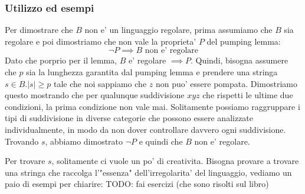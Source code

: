 
\subsubsection{Utilizzo ed esempi}
Per dimostrare che $ B $ non e' un linguaggio regolare, prima assumiamo che $ B $ sia regolare e poi dimostriamo che non vale la proprieta' $ P $ del pumping lemma:
\[
\lnot P \implies B \text{ non e' regolare}
\]
Dato che porprio per il lemma, $ B $ e' regolare $ \implies P $. Quindi, bisogna assumere che $ p $ sia la lunghezza garantita dal pumping lemma e prendere una stringa $ s \in B. |s| \geq p $ tale che noi sappiamo che $ z $ non puo' essere pompata. Dimostriamo questo mostrando che per qualunque suddivisione $ xyz $ che rispetti le ultime due condizioni, la prima condizione non vale mai. Solitamente possiamo raggruppare i tipi di suddivisione in diverse categorie che possono essere analizzate individualmente, in modo da non dover controllare davvero ogni suddivisione. Trovando $ s $, abbiamo dimostrato $ \lnot P $ e quindi che $ B $ non e' regolare. 

Per trovare $ s $, solitamente ci vuole un po' di creativita. Bisogna provare a trovare una stringa che raccolga l'"essenza" dell'irregolarita' del linguaggio, vediamo un paio di esempi per chiarire:
TODO: fai esercizi (che sono risolti sul libro)

